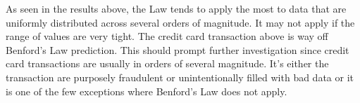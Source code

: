 As seen in the results above, the Law tends to 
apply the most to data that are uniformly 
distributed across several orders of magnitude. 
It may not apply if the range of values are 
very tight. The credit card transaction above 
is way off Benford’s Law prediction. 
This should prompt further investigation 
since credit card transactions are usually 
in orders of several magnitude. 
It’s either the transaction are purposely 
fraudulent or unintentionally filled 
with bad data or it is one of 
the few exceptions where Benford’s Law does not apply.



 
